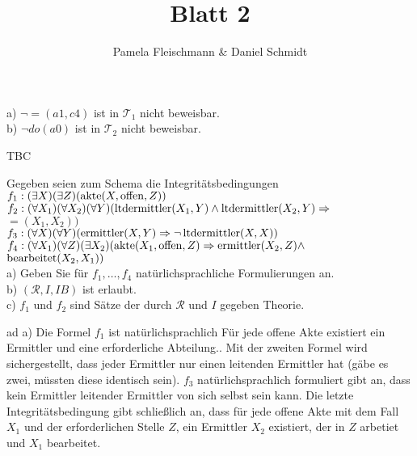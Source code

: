 \documentclass[12pt,a4paper]{amsart}
\begin{document}
\title{Blatt 2}

\author{Pamela Fleischmann \& Daniel Schmidt}

\maketitle

\begin{aufgabe1}
a) $\lnot =(a1,c4)$ ist in $\mathcal{T}_1$ nicht beweisbar.\\
b) $\lnot do(a0)$ ist in $\mathcal{T}_2$ nicht beweisbar.
\end{aufgabe1}

\medskip

TBC

\bigskip

\begin{aufgabe1}
Gegeben seien zum Schema die Integritätsbedingungen\\
$f_1:(\exists X)(\exists Z)(\operatorname{akte}(X,\operatorname{offen},Z))$\\
$f_2:(\forall X_1)(\forall X_2)(\forall Y)(\operatorname{ltdermittler}(X_1,Y)\land\operatorname{ltdermittler}(X_2,Y)\Rightarrow$\\ $=(X_1,X_2))$\\
$f_3:(\forall X)(\forall Y)(\operatorname{ermittler}(X,Y)\Rightarrow\lnot\operatorname{ltdermittler}(X,X))$\\
$f_4:(\forall X_1)(\forall Z)(\exists X_2)(\operatorname{akte}(X_1,\operatorname{offen},Z)\Rightarrow\operatorname{ermittler}(X_2,Z)\land$\\ $\operatorname{bearbeitet}(X_2,X_1))$\\
a) Geben Sie für $f_1,\dots,f_4$ natürlichsprachliche Formulierungen an.\\
b) $(\mathcal{R},I,IB)$ ist erlaubt.\\
c) $f_1$ und $f_2$ sind Sätze der durch $\mathcal{R}$ und $I$ gegeben Theorie.
\end{aufgabe1}

\medskip

ad a) Die Formel $f_1$ ist natürlichsprachlich \glqq Für jede offene Akte existiert ein Ermittler und eine erforderliche Abteilung.\grqq . Mit
der zweiten Formel wird sichergestellt, dass jeder Ermittler nur einen leitenden Ermittler hat (gäbe es zwei, müssten diese identisch sein). $f_3$
natürlichsprachlich formuliert gibt an, dass kein Ermittler leitender Ermittler von sich selbst sein kann. Die letzte Integritätsbedingung gibt
schließlich an, dass für jede offene Akte mit dem Fall $X_1$ und der erforderlichen Stelle $Z$, ein Ermittler $X_2$ existiert, der in $Z$ arbetiet und
$X_1$ bearbeitet.
\end{document}
